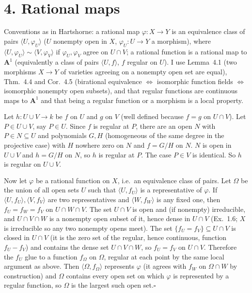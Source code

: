 \documentclass[11pt]{article}
\begin{document}
\section*{4. Rational maps}

Conventions as in Hartshorne: a rational map $\varphi:X\to Y$ is an equivalence class of pairs $\langle U,\varphi_U\rangle$ ($U$ nonempty open in $X$, $\varphi_U:U\to Y$ a morphism), where $\langle U,\varphi_U\rangle\sim\langle V,\varphi_V\rangle$ if $\varphi_U,\varphi_V$ agree on $U\cap V$; a rational function is a rational map to $\mathbf A^1$ (equivalently a class of pairs $\langle U,f\rangle$, $f$ regular on $U$). I use Lemma~4.1 (two morphisms $X\to Y$ of varieties agreeing on a nonempty open set are equal), Thm.~4.4 and Cor.~4.5 (birational equivalence $\Leftrightarrow$ isomorphic function fields $\Leftrightarrow$ isomorphic nonempty open subsets), and that regular functions are continuous maps to $\mathbf A^1$ and that being a regular function or a morphism is a local property.

\pf
Let $h:U\cup V\to k$ be $f$ on $U$ and $g$ on $V$ (well defined because $f=g$ on $U\cap V$). Let $P\in U\cup V$, say $P\in U$. Since $f$ is regular at $P$, there are an open $N$ with $P\in N\subseteq U$ and polynomials $G,H$ (homogeneous of the same degree in the projective case) with $H$ nowhere zero on $N$ and $f=G/H$ on $N$. $N$ is open in $U\cup V$ and $h=G/H$ on $N$, so $h$ is regular at $P$. The case $P\in V$ is identical. So $h$ is regular on $U\cup V$.

Now let $\varphi$ be a rational function on $X$, i.e.\ an equivalence class of pairs. Let $\Omega$ be the union of all open sets $U$ such that $\langle U,f_U\rangle$ is a representative of $\varphi$. If $\langle U,f_U\rangle,\langle V,f_V\rangle$ are two representatives and $\langle W,f_W\rangle$ is any fixed one, then $f_U=f_W=f_V$ on $U\cap W\cap V$. The set $U\cap V$ is open and (if nonempty) irreducible, and $U\cap V\cap W$ is a nonempty open subset of it, hence dense in $U\cap V$ (Ex.~1.6; $X$ is irreducible so any two nonempty opens meet). The set $\{f_U=f_V\}\subseteq U\cap V$ is closed in $U\cap V$ (it is the zero set of the regular, hence continuous, function $f_U-f_V$) and contains the dense set $U\cap V\cap W$, so $f_U=f_V$ on $U\cap V$. Therefore the $f_U$ glue to a function $f_\Omega$ on $\Omega$, regular at each point by the same local argument as above. Then $\langle\Omega,f_\Omega\rangle$ represents $\varphi$ (it agrees with $f_W$ on $\Omega\cap W$ by construction) and $\Omega$ contains every open set on which $\varphi$ is represented by a regular function, so $\Omega$ is the largest such open set.\hfill$\square$
\end{document}
